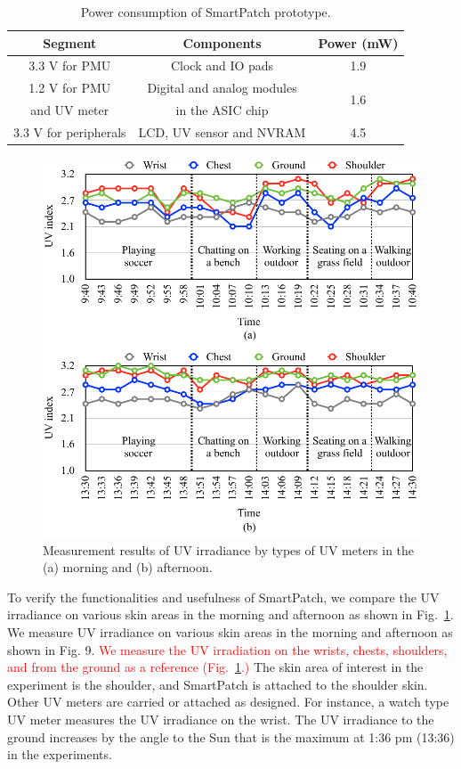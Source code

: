 \documentclass[journal]{IEEEtran}
\begin{document}
\begin{table}
\centering
\caption{Power consumption of SmartPatch prototype.}
\label{table:power_summary}
\begin{tabular}{|c|c|c|}  \hline
Segment 			&Components					&Power (mW)	\\ \hline \hline
3.3 V for PMU		&Clock and IO pads			&1.9	\\ \hline
1.2 V for PMU 		&Digital and analog modules		&\multirow{2}{*}{1.6}		\\
and UV meter 	&in the ASIC chip 				&\\ \hline
3.3 V for peripherals & LCD, UV sensor and NVRAM	&4.5 \\ \hline

\end{tabular}
\end{table}

\begin{figure}
\centering
\includegraphics[width=1.0\hsize]{Figures/UV_measure.pdf}
\caption{Measurement results of UV irradiance by types of UV meters in the (a) morning and (b) afternoon.}
\label{fig:UV_measure}
\end{figure}

To verify the functionalities and usefulness of SmartPatch, we compare the UV irradiance on various skin areas in the morning and afternoon as shown in Fig.~\ref{fig:UV_measure}. We measure UV irradiance on various skin areas in the morning and afternoon as shown in Fig. 9. \textcolor{red}{We measure the UV irradiation on the wrists, chests, shoulders, and from the ground as a reference (Fig.~\ref{fig:UV_measure}.)} The skin area of interest in the experiment is the shoulder, and SmartPatch is attached to the shoulder skin. Other UV meters are carried or attached as designed. For instance, a watch type UV meter measures the UV irradiance on the wrist. The UV irradiance to the ground increases by the angle to the Sun that is the maximum at 1:36 pm (13:36) in the experiments.
\end{document}
